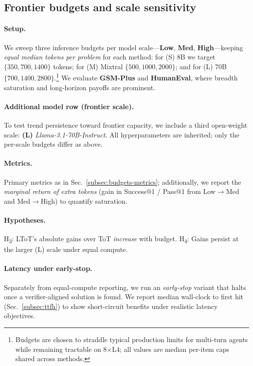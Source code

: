\documentclass{article}
\begin{document}
\subsection{Frontier budgets and scale sensitivity}
\label{subsec:frontier-budgets}

\paragraph{Setup.}
We sweep three inference budgets per model scale—\textbf{Low}, \textbf{Med}, \textbf{High}—keeping \emph{equal median tokens per problem} for each method:
for (S) 8B we target $\{350,700,1400\}$ tokens; for (M) Mixtral $\{500,1000,2000\}$; and for (L) 70B $\{700,1400,2800\}$.\footnote{Budgets are chosen to straddle typical production limits for multi-turn agents while remaining tractable on 8$\times$L4; all values are median per-item caps shared across methods.}
We evaluate \textbf{GSM-Plus} and \textbf{HumanEval}, where breadth saturation and long-horizon payoffs are prominent.

\paragraph{Additional model row (frontier scale).}
To test trend persistence toward frontier capacity, we include a third open-weight scale:
\textbf{(L)} \emph{Llama-3.1-70B-Instruct}.
All hyperparameters are inherited; only the per-scale budgets differ as above.

\paragraph{Metrics.}
Primary metrics as in Sec.~\ref{subsec:budgets-metrics}; additionally, we report the \emph{marginal return of extra tokens} (gain in Success@1 / Pass@1 from Low$\to$Med and Med$\to$High) to quantify saturation.

\paragraph{Hypotheses.}
H\textsubscript{3}: LToT's absolute gains over ToT \emph{increase} with budget.
H\textsubscript{4}: Gains persist at the larger (L) scale under equal compute.

\paragraph{Latency under early-stop.}
Separately from equal-compute reporting, we run an \emph{early-stop} variant that halts once a verifier-aligned solution is found.
We report median wall-clock to first hit (Sec.~\ref{subsec:ttfh}) to show short-circuit benefits under realistic latency objectives.
\end{document}
